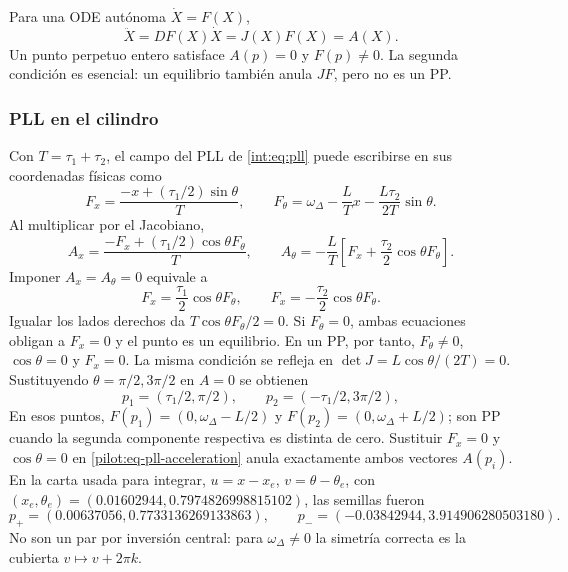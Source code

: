 Para una ODE autónoma $\dot X=F(X)$,
\begin{equation}
 \ddot X=DF(X)\dot X=J(X)F(X)=A(X).
 \label{pilot:eq-integer-acceleration}
\end{equation}
Un punto perpetuo entero satisface $A(p)=0$ y $F(p)\ne0$. La segunda condición
es esencial: un equilibrio también anula $JF$, pero no es un PP.

\subsubsection{PLL en el cilindro}

Con $T=\tau_1+\tau_2$, el campo del PLL de \eqref{int:eq:pll} puede escribirse
en sus coordenadas físicas como
\begin{equation}
 F_x=\frac{-x+(\tau_1/2)\sin\theta}{T},\qquad
 F_\theta=\omega_\Delta-\frac{L}{T}x
 -\frac{L\tau_2}{2T}\sin\theta.
 \label{pilot:eq-pll-field}
\end{equation}
Al multiplicar por el Jacobiano,
\begin{equation}
 A_x=\frac{-F_x+(\tau_1/2)\cos\theta F_\theta}{T},
 \qquad
 A_\theta=-\frac{L}{T}
 \left[F_x+\frac{\tau_2}{2}\cos\theta F_\theta\right].
 \label{pilot:eq-pll-acceleration}
\end{equation}
Imponer \(A_x=A_\theta=0\) equivale a
\[
 F_x=\frac{\tau_1}{2}\cos\theta F_\theta,
 \qquad F_x=-\frac{\tau_2}{2}\cos\theta F_\theta.
\]
Igualar los lados derechos da \(T\cos\theta F_\theta/2=0\). Si
\(F_\theta=0\), ambas ecuaciones obligan a \(F_x=0\) y el punto es un
equilibrio. En un PP, por tanto, \(F_\theta\ne0\), \(\cos\theta=0\) y
\(F_x=0\). La misma condición se refleja en
\(\det J=L\cos\theta/(2T)=0\). Sustituyendo
$\theta=\pi/2,3\pi/2$ en $A=0$ se obtienen
\begin{equation}
 p_1=(\tau_1/2,\pi/2),\qquad
 p_2=(-\tau_1/2,3\pi/2),
 \label{pilot:eq-pll-pp-original}
\end{equation}
En esos puntos, \(F(p_1)=(0,\omega_\Delta-L/2)\) y
\(F(p_2)=(0,\omega_\Delta+L/2)\); son PP cuando la segunda componente
respectiva es distinta de cero. Sustituir \(F_x=0\) y \(\cos\theta=0\) en
\eqref{pilot:eq-pll-acceleration} anula exactamente ambos vectores \(A(p_i)\). En la carta usada para integrar,
$u=x-x_e$, $v=\theta-\theta_e$, con
$(x_e,\theta_e)=(0.01602944,0.7974826998815102)$, las semillas fueron
\begin{equation}
 p_+=(0.00637056,0.7733136269133863),\qquad
 p_-=(-0.03842944,3.914906280503180).
 \label{pilot:eq-pll-pp-shifted}
\end{equation}
No son un par por inversión central: para $\omega_\Delta\ne0$ la simetría
correcta es la cubierta $v\mapsto v+2\pi k$.

